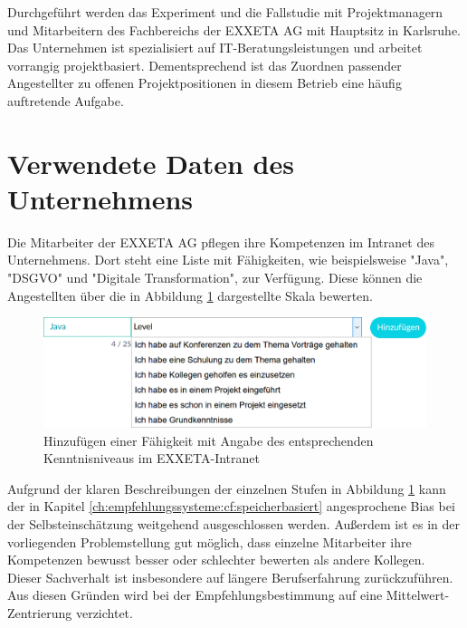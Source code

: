 Durchgeführt werden das Experiment und die Fallstudie mit Projektmanagern und Mitarbeitern des Fachbereichs \JES der EXXETA AG mit Hauptsitz in Karlsruhe. Das Unternehmen ist spezialisiert auf IT-Beratungsleistungen und arbeitet vorrangig projektbasiert. Dementsprechend ist das Zuordnen passender Angestellter zu offenen Projektpositionen in diesem Betrieb eine häufig auftretende Aufgabe.

\section{Verwendete Daten des Unternehmens}
\label{ch:methodik:versuchsaufbau}
Die Mitarbeiter der EXXETA AG pflegen ihre Kompetenzen im Intranet des Unternehmens. Dort steht eine Liste mit \anzFaehigkeiten Fähigkeiten, wie beispielsweise "Java", "DSGVO" und "Digitale Transformation", zur Verfügung. Diese können die Angestellten über die in Abbildung \ref{fig:methodik:versuchsaufbau:daten:abb1} dargestellte Skala bewerten.

\begin{figure}[h]
	\centering
	\includegraphics[width=1\textwidth]{gfx/skill-level.png}
	\caption{Hinzufügen einer Fähigkeit mit Angabe des entsprechenden Kenntnisniveaus im EXXETA-Intranet}
	\label{fig:methodik:versuchsaufbau:daten:abb1}
\end{figure}

Aufgrund der klaren Beschreibungen der einzelnen Stufen in Abbildung \ref{fig:methodik:versuchsaufbau:daten:abb1} kann der in Kapitel \ref{ch:empfehlungssysteme:cf:speicherbasiert} angesprochene Bias bei der Selbsteinschätzung weitgehend ausgeschlossen werden. Außerdem ist es in der vorliegenden Problemstellung gut möglich, dass einzelne Mitarbeiter ihre Kompetenzen bewusst besser oder schlechter bewerten als andere Kollegen. Dieser Sachverhalt ist insbesondere auf längere Berufserfahrung zurückzuführen. Aus diesen Gründen wird bei der Empfehlungsbestimmung auf eine Mittelwert-Zentrierung verzichtet.

